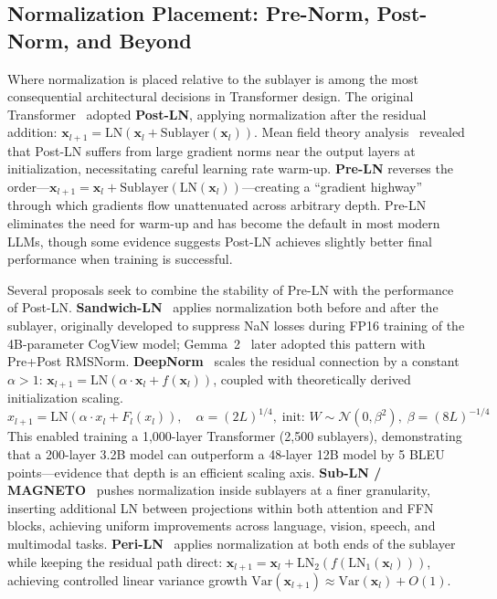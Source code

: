 \subsection{Normalization Placement: Pre-Norm, Post-Norm, and Beyond}

Where normalization is placed relative to the sublayer is among the most consequential architectural decisions in Transformer design.
The original Transformer~\cite{vaswani2017attention} adopted \textbf{Post-LN}, applying normalization after the residual addition: $\mathbf{x}_{l+1} = \text{LN}(\mathbf{x}_l + \text{Sublayer}(\mathbf{x}_l))$.
Mean field theory analysis~\cite{xiong2020layer} revealed that Post-LN suffers from large gradient norms near the output layers at initialization, necessitating careful learning rate warm-up.
\textbf{Pre-LN} reverses the order---$\mathbf{x}_{l+1} = \mathbf{x}_l + \text{Sublayer}(\text{LN}(\mathbf{x}_l))$---creating a ``gradient highway'' through which gradients flow unattenuated across arbitrary depth.
Pre-LN eliminates the need for warm-up and has become the default in most modern LLMs, though some evidence suggests Post-LN achieves slightly better final performance when training is successful.

Several proposals seek to combine the stability of Pre-LN with the performance of Post-LN.
\textbf{Sandwich-LN}~\cite{ding2021cogview} applies normalization both before and after the sublayer, originally developed to suppress NaN losses during FP16 training of the 4B-parameter CogView model; Gemma~2~\cite{gemma2024improving} later adopted this pattern with Pre+Post RMSNorm.
\textbf{DeepNorm}~\cite{wang2024deepnet} scales the residual connection by a constant $\alpha > 1$: $\mathbf{x}_{l+1} = \text{LN}(\alpha \cdot \mathbf{x}_l + f(\mathbf{x}_l))$, coupled with theoretically derived initialization scaling.
\begin{equation}
x_{l+1} = \mathrm{LN}\!\left(\alpha \cdot x_l + F_l(x_l)\right), \quad \alpha = (2L)^{1/4},\; \text{init: } W \sim \mathcal{N}(0, \beta^2), \; \beta = (8L)^{-1/4}
\label{eq:deepnorm}
\end{equation}
This enabled training a 1,000-layer Transformer (2,500 sublayers), demonstrating that a 200-layer 3.2B model can outperform a 48-layer 12B model by 5 BLEU points---evidence that depth is an efficient scaling axis.
\textbf{Sub-LN / MAGNETO}~\cite{wang2022magneto} pushes normalization inside sublayers at a finer granularity, inserting additional LN between projections within both attention and FFN blocks, achieving uniform improvements across language, vision, speech, and multimodal tasks.
\textbf{Peri-LN}~\cite{kim2025periln} applies normalization at both ends of the sublayer while keeping the residual path direct: $\mathbf{x}_{l+1} = \mathbf{x}_l + \text{LN}_2(f(\text{LN}_1(\mathbf{x}_l)))$, achieving controlled linear variance growth $\text{Var}(\mathbf{x}_{l+1}) \approx \text{Var}(\mathbf{x}_l) + O(1)$.

